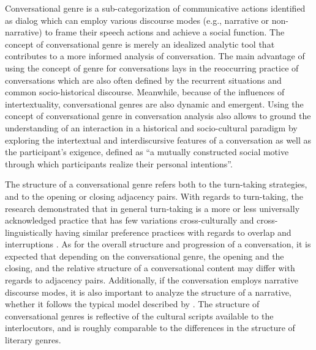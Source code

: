 \documentclass[12pt, draft]{article}
\begin{document}
Conversational genre is a sub-categorization of communicative actions identified as dialog which can employ various discourse modes (e.g., narrative or non-narrative) to frame their speech actions and achieve a social function. The concept of conversational genre is merely an idealized analytic tool that contributes to a more informed analysis of conversation. The main advantage of using the concept of genre for conversations lays in the reoccurring practice of conversations which are also often defined by the recurrent situations and common socio-historical discourse. Meanwhile, because of the influences of intertextuality, conversational genres are also dynamic and emergent. Using the concept of conversational genre in conversation analysis also allows to ground the understanding of an interaction in a historical and socio-cultural paradigm by exploring the intertextual and interdiscursive features of a conversation as well as the participant's exigence, defined as ``a mutually constructed social motive through which participants realize their personal intentions''\parencite[p. 333]{mayes2005}.

The structure of a conversational genre refers both to the turn-taking strategies, and to the opening or closing adjacency pairs. With regards to turn-taking, the research demonstrated that in general turn-taking is a more or less universally acknowledged practice that has few variations cross-culturally and cross-linguistically having similar preference practices with regards to overlap and interruptions \parencite{stivers2009}. As for the overall structure and progression of a conversation, it is expected that depending on the conversational genre, the opening and the closing, and the relative structure of a conversational content may differ with regards to adjacency pairs. Additionally, if the conversation employs narrative discourse modes, it is also important to analyze the structure of a narrative, whether it follows the typical model described by \textcite{labov1967}. The structure of conversational genres is reflective of the cultural scripts available to the interlocutors, and is roughly comparable to the differences in the structure of literary genres.
\end{document}

